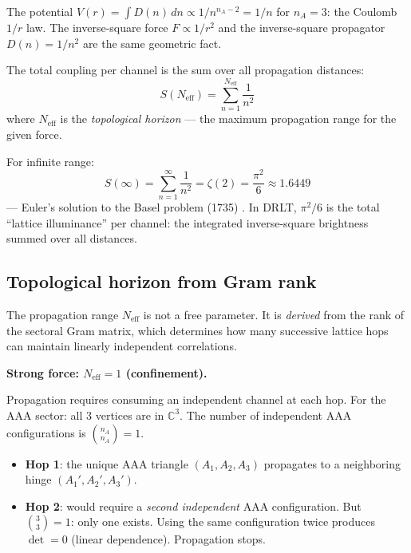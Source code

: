 \begin{remark}
The potential $V(r) = \int D(n)\,dn \propto 1/n^{n_A-2} = 1/n$ for $n_A = 3$: the Coulomb $1/r$ law. The inverse-square force $F \propto 1/r^2$ and the inverse-square propagator $D(n) = 1/n^2$ are the same geometric fact.
\end{remark}

The total coupling per channel is the sum over all propagation distances:
\begin{equation}
S(N_\text{eff}) = \sum_{n=1}^{N_\text{eff}} \frac{1}{n^2}
\label{eq:partial_Basel}
\end{equation}
where $N_\text{eff}$ is the \emph{topological horizon} --- the maximum propagation range for the given force.

For infinite range:
\begin{equation}
S(\infty) = \sum_{n=1}^{\infty} \frac{1}{n^2} = \zeta(2) = \frac{\pi^2}{6} \approx 1.6449
\end{equation}
--- Euler's solution to the Basel problem (1735) \cite{Euler}. In DRLT, $\pi^2/6$ is the total ``lattice illuminance'' per channel: the integrated inverse-square brightness summed over all distances.

\subsection{Topological horizon from Gram rank}
\label{sec:Neff}

The propagation range $N_\text{eff}$ is not a free parameter. It is \emph{derived} from the rank of the sectoral Gram matrix, which determines how many successive lattice hops can maintain linearly independent correlations.

\bigskip

\noindent\textbf{Strong force: $N_\text{eff} = 1$ (confinement).}

Propagation requires consuming an independent channel at each hop. For the AAA sector: all 3 vertices are in $\mathbb{C}^3$. The number of independent AAA configurations is $\binom{n_A}{n_A} = 1$.

\begin{itemize}
\item \textbf{Hop 1}: the unique AAA triangle $(A_1, A_2, A_3)$ propagates to a neighboring hinge $(A_1', A_2', A_3')$.
\item \textbf{Hop 2}: would require a \emph{second independent} AAA configuration. But $\binom{3}{3} = 1$: only one exists. Using the same configuration twice produces $\det = 0$ (linear dependence). Propagation stops.
\end{itemize}

